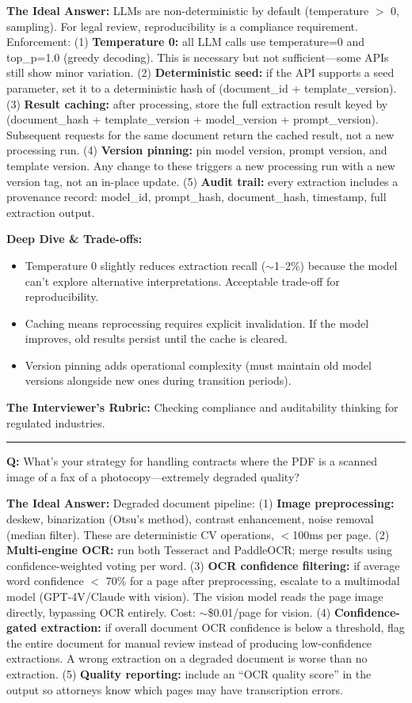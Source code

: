 \textbf{The Ideal Answer:} LLMs are non-deterministic by default (temperature $>$ 0, sampling). For legal review, reproducibility is a compliance requirement. Enforcement: (1) \textbf{Temperature 0:} all LLM calls use temperature=0 and top\_p=1.0 (greedy decoding). This is necessary but not sufficient---some APIs still show minor variation. (2) \textbf{Deterministic seed:} if the API supports a seed parameter, set it to a deterministic hash of (document\_id + template\_version). (3) \textbf{Result caching:} after processing, store the full extraction result keyed by (document\_hash + template\_version + model\_version + prompt\_version). Subsequent requests for the same document return the cached result, not a new processing run. (4) \textbf{Version pinning:} pin model version, prompt version, and template version. Any change to these triggers a new processing run with a new version tag, not an in-place update. (5) \textbf{Audit trail:} every extraction includes a provenance record: model\_id, prompt\_hash, document\_hash, timestamp, full extraction output.

\textbf{Deep Dive \& Trade-offs:}
\begin{itemize}
  \item Temperature 0 slightly reduces extraction recall ($\sim$1--2\%) because the model can't explore alternative interpretations. Acceptable trade-off for reproducibility.
  \item Caching means reprocessing requires explicit invalidation. If the model improves, old results persist until the cache is cleared.
  \item Version pinning adds operational complexity (must maintain old model versions alongside new ones during transition periods).
\end{itemize}

\textbf{The Interviewer's Rubric:} Checking compliance and auditability thinking for regulated industries.

\bigskip\hrule\bigskip

\textbf{Q:} What's your strategy for handling contracts where the PDF is a scanned image of a fax of a photocopy---extremely degraded quality?

\textbf{The Ideal Answer:} Degraded document pipeline: (1) \textbf{Image preprocessing:} deskew, binarization (Otsu's method), contrast enhancement, noise removal (median filter). These are deterministic CV operations, $<$100ms per page. (2) \textbf{Multi-engine OCR:} run both Tesseract and PaddleOCR; merge results using confidence-weighted voting per word. (3) \textbf{OCR confidence filtering:} if average word confidence $<$ 70\% for a page after preprocessing, escalate to a multimodal model (GPT-4V/Claude with vision). The vision model reads the page image directly, bypassing OCR entirely. Cost: $\sim$\$0.01/page for vision. (4) \textbf{Confidence-gated extraction:} if overall document OCR confidence is below a threshold, flag the entire document for manual review instead of producing low-confidence extractions. A wrong extraction on a degraded document is worse than no extraction. (5) \textbf{Quality reporting:} include an ``OCR quality score'' in the output so attorneys know which pages may have transcription errors.

